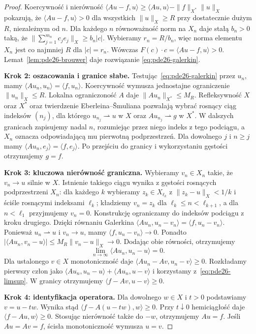 \begin{proof}
Koercywność i nierówność
$\langle Au-f,u\rangle\ge\langle Au,u\rangle
-\|f\|_{X^*}\|u\|_X$ pokazują, że
$\langle Au-f,u\rangle>0$ dla wszystkich
$\|u\|_X\ge R$ przy dostatecznie dużym $R$,
niezależnym od $n$.
Dla każdego $n$ równoważność norm na $X_n$ daje
stałą $b_n>0$ taką, że
$\|\sum_{j=1}^{m_n} c_je_j\|_X\ge b_n|c|$.
Wybieramy $r_n=R/b_n$, więc norma elementu $X_n$
jest co najmniej $R$ dla $|c|=r_n$.
Wówczas $F(c)\cdot c=\langle Au-f,u\rangle>0$.
Lemat~\ref{lem:pde26-brouwer} daje rozwiązanie
\eqref{eq:pde26-galerkin}.

\textbf{Krok 2: oszacowania i granice słabe.}
Testując~\eqref{eq:pde26-galerkin} przez $u_n$, mamy
$\langle Au_n,u_n\rangle=\langle f,u_n\rangle$.
Koercywność wymusza jednostajne ograniczenie
$\|u_n\|_X\le R$. Lokalna ograniczoność $A$ daje
$\|Au_n\|_{X^*}\le M_R$. Refleksywność $X$ oraz $X^*$
oraz twierdzenie Eberleina--Šmuliana pozwalają
wybrać rosnący ciąg indeksów $(n_j)$, dla którego
$u_{n_j}\rightharpoonup u$ w $X$ oraz
$Au_{n_j}\rightharpoonup g$ w $X^*$.
W dalszych granicach zapisujemy nadal $n$,
rozumiejąc przez niego indeks z tego podciągu,
a $X_n$ oznacza odpowiadającą mu pierwotną podprzestrzeń.
Dla dowolnego $j$ i $n\ge j$ mamy
$\langle Au_n,e_j\rangle=\langle f,e_j\rangle$.
Po przejściu do granicy i wykorzystaniu gęstości
otrzymujemy $g=f$.

\textbf{Krok 3: kluczowa nierówność graniczna.}
Wybieramy $v_n\in X_n$ takie, że $v_n\to u$ silnie
w $X$. Istnienie takiego ciągu wynika z gęstości
rosnących podprzestrzeni $X_n$: dla każdego $k$ wybieramy
$z_k\in X_{\ell_k}$ z $\|z_k-u\|_X<1/k$ i
ściśle rosnącymi indeksami $\ell_k$; kładziemy
$v_n=z_k$ dla $\ell_k\le n<\ell_{k+1}$, a dla
$n<\ell_1$ przyjmujemy $v_n=0$.
Konstrukcję ograniczamy do indeksów podciągu
z kroku drugiego. Dzięki równaniu Galerkina
$\langle Au_n,u_n-v_n\rangle=\langle f,u_n-v_n\rangle$.
Ponieważ $u_n\rightharpoonup u$ i $v_n\to u$,
mamy $\langle f,u_n-v_n\rangle\to0$.
Ponadto
$|\langle Au_n,v_n-u\rangle|\le M_R\|v_n-u\|_X\to0$.
Dodając obie równości, otrzymujemy
\begin{equation}\label{eq:pde26-limsup}
 \lim_{n\to\infty}\langle Au_n,u_n-u\rangle=0.
\end{equation}
Dla ustalonego $v\in X$ monotoniczność daje
$\langle Au_n-Av,u_n-v\rangle\ge0$.
Rozkładamy pierwszy człon jako
$\langle Au_n,u_n-u\rangle+\langle Au_n,u-v\rangle$
i korzystamy z~\eqref{eq:pde26-limsup}. W granicy
otrzymujemy $\langle f-Av,u-v\rangle\ge0$.

\textbf{Krok 4: identyfikacja operatora.}
Dla dowolnego $w\in X$ i $t>0$ podstawiamy $v=u-tw$.
Wynika stąd $\langle f-A(u-tw),w\rangle\ge0$.
Przy $t\downarrow0$ hemiciągłość daje
$\langle f-Au,w\rangle\ge0$. Stosując nierówność także
do $-w$, otrzymujemy $Au=f$.
Jeśli $Au=Av=f$, ścisła monotoniczność wymusza $u=v$.
\end{proof}

